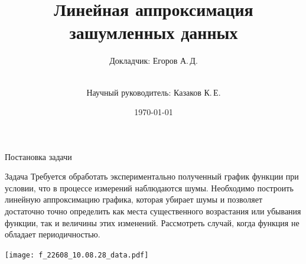 \documentclass[ignoreonframetext,unicode]{beamer}
\title{Линейная аппроксимация зашумленных данных}
\author[Егоров А.\,Д.]{Докладчик: Егоров А.\,Д.\and\\[0.5mm] Научный руководитель: Казаков К.\,Е.}
\institute[каф. Прикладная математика ФН-2]{группа ФН2-52Б}
\date{\today}
\begin{document}
	
	\begin{frame}[plain]
		\maketitle
	\end{frame}

	
	
	

\begin{frame}{Постановка задачи}
	\small
	\begin{block}{Задача}
		Требуется обработать экспериментально полученный график функции при условии, что в процессе измерений наблюдаются шумы. Необходимо построить линейную аппроксимацию графика, которая убирает шумы и позволяет достаточно точно определить как места существенного возрастания или убывания функции, так и величины этих изменений. Рассмотреть случай, когда функция не обладает периодичностью.
	\end{block}
			
	\center
	\texttt{[image: f\_22608\_10.08.28\_data.pdf]}
		
	\normalsize
\end{frame}

	
\end{document}
